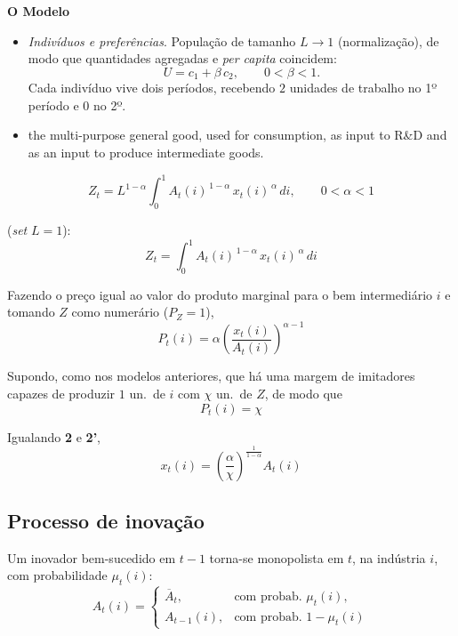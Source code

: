 \documentclass[a4paper,12pt]{article}[abntex2]
\begin{document}
\textbf{O Modelo}

\begin{itemize}
    \item \textit{Indivíduos e preferências}.  
          População de tamanho $L\rightarrow1$ (normalização), de modo que quantidades agregadas e \emph{per capita} coincidem:
          \[
              U = c_{1} + \beta\,c_{2}, \qquad 0<\beta<1.
          \]
          Cada indivíduo vive dois períodos, recebendo $2$ unidades de trabalho no 1º período e $0$ no 2º.
\end{itemize}


\begin{itemize}
    \item the multi-purpose general good, used for consumption, as input to R\&D and as an input to produce intermediate goods.
\end{itemize}

\[
    Z_t
      = L^{1-\alpha}\!
        \int_{0}^{1} A_t(i)^{\,1-\alpha}\,x_t(i)^{\,\alpha}\,di,
    \qquad 0<\alpha<1
    \tag{1}
\]

(\emph{set } $L=1$):
\[
    Z_t
      = \int_{0}^{1} A_t(i)^{\,1-\alpha}\,x_t(i)^{\,\alpha}\,di
    \tag{1'}
\]

Fazendo o preço igual ao valor do produto marginal para o bem intermediário $i$ e tomando $Z$ como numerário ($P_Z=1$),
\[
    P_t(i)
      = \alpha\!\left(\frac{x_t(i)}{A_t(i)}\right)^{\alpha-1}
    \tag{2}
\]

Supondo, como nos modelos anteriores, que há uma margem de imitadores capazes de produzir $1$ un.\ de $i$ com $\chi$ un.\ de $Z$, de modo que
\[
    P_t(i)=\chi
    \tag{2'}
\]

Igualando \textbf{2} e \textbf{2'},
\[
    x_t(i)
      = \left(\frac{\alpha}{\chi}\right)^{\frac{1}{1-\alpha}} A_t(i)
    \tag{3}
\]

\subsection{\textbf{Processo de inovação}}

Um inovador bem-sucedido em $t-1$ torna-se monopolista em $t$, na indústria $i$, com probabilidade $\mu_t(i)$:
\[
    A_t(i)=
    \begin{cases}
        \overline{A}_t,   & \text{com probab.\ }\mu_t(i),\\[6pt]
        A_{t-1}(i),       & \text{com probab.\ }1-\mu_t(i)
    \end{cases}
    \tag{4}
\]
\end{document}
